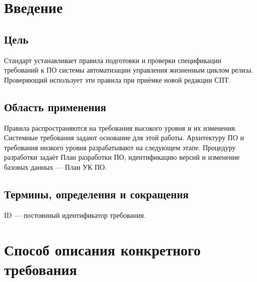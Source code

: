 \documentclass{tpks}
\begin{document}
\makeheader
\begin{changelog}
\end{changelog}

\section{Введение}
\subsection{Цель}
Стандарт устанавливает правила подготовки и проверки спецификации требований к ПО системы автоматизации управления жизненным циклом релиза. Проверяющий использует эти правила при приёмке новой редакции СПТ.

\subsection{Область применения}
Правила распространяются на требования высокого уровня и их изменения. Системные требования задают основание для этой работы. Архитектуру ПО и требования низкого уровня разрабатывают на следующем этапе. Процедуру разработки задаёт План разработки ПО, идентификацию версий и изменение базовых данных --- План УК ПО.

\subsection{Термины, определения и сокращения}
ID --- постоянный идентификатор требования.

\section{Способ описания конкретного требования}
\end{document}
